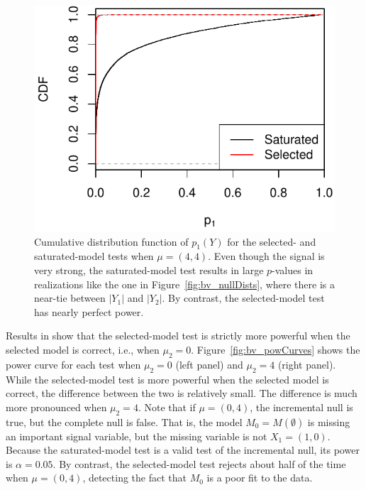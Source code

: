 \documentclass{article}
\begin{document}
\begin{figure}
  \centering
  \includegraphics[width=.5\textwidth]{figs/bivariateSelVSat_rocCurve.pdf}
  \caption{Cumulative distribution function of $p_1(Y)$ for the selected- and saturated-model tests when $\mu=(4,4)$. Even though the signal is very strong, the saturated-model test results in large $p$-values in realizations like the one in Figure~\ref{fig:bv_nullDists}, where there is a near-tie between $|Y_1|$ and $|Y_2|$. By contrast, the selected-model test has nearly perfect power.}
  \label{fig:bv_rocCurve}
\end{figure}

Results in \citet{fithian2014optimal} show that the selected-model test is strictly more powerful when the selected model is correct, i.e., when $\mu_2=0$. Figure~\ref{fig:bv_powCurves} shows the power curve for each test when $\mu_2=0$ (left panel) and $\mu_2=4$ (right panel). While the selected-model test is more powerful when the selected model is correct, the difference between the two is relatively small. The difference is much more pronounced when $\mu_2=4$. Note that if $\mu=(0,4)$, the incremental null is true, but the complete null is false. That is, the model $M_0 = M(\emptyset)$ is missing an important signal variable, but the missing variable is not $X_1 = (1,0)$. Because the saturated-model test is a valid test of the incremental null, its power is $\alpha=0.05$. By contrast, the selected-model test rejects about half of the time when $\mu=(0,4)$, detecting the fact that $M_0$ is a poor fit to the data.
\end{document}

